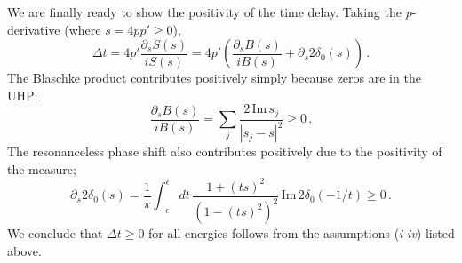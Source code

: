 \documentclass[
 reprint,
 amsmath,
 pre,
 amssymb,
 nofootinbib,
 aps,
 longbibliography,
]{revtex4-1}
\newcommand{\<}{{\langle}}
\renewcommand{\>}{{\rangle}}
\begin{document}
We are finally ready to show the positivity of the time delay. Taking the $p$-derivative (where $s=4pp'\geq 0$),
\begin{equation}
    \Delta t = 4p' \frac{\partial_s S(s)}{iS(s)} = 4p' \left(\frac{\partial_s B(s)}{iB(s)} + \partial_s 2\delta_0(s)\right)\,.
\end{equation}
The Blaschke product contributes positively simply because zeros are in the UHP;
\begin{equation}
    \frac{\partial_s B(s)}{iB(s)} = \sum_j \frac{2\, \text{Im}\,s_j}{|s_j-s|^2}\geq 0\,.
\end{equation}
The resonanceless phase shift also contributes positively due to the positivity of the measure;
\begin{equation}
    \partial_s 2\delta_0(s) = \frac{1}{\pi}\int_{-\epsilon}^{\epsilon} dt\, \frac{1+(ts)^2}{(1-(ts)^2)^2}\,\text{Im}\, 2\delta_0(-1/t)\geq 0\,.
\end{equation}
We conclude that $\Delta t\geq 0$ for all energies follows from the assumptions (\textit{i}-\textit{iv}) listed above.
\end{document}
